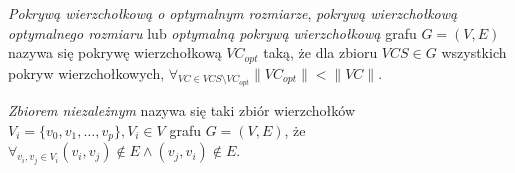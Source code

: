 \begin{definition}
  \emph{Pokrywą wierzchołkową o optymalnym rozmiarze}, \emph{pokrywą 
  wierzchołkową optymalnego rozmiaru} lub \emph{optymalną pokrywą wierzchołkową} 
  grafu $G=(V,E)$ nazywa się pokrywę wierzchołkową $VC_{opt}$ taką, że dla 
  zbioru $VCS \in G$ wszystkich pokryw wierzchołkowych,
  $\forall_{VC \in VCS \setminus VC_{opt}}{\|VC_{opt}\| < \|VC\|}$.
\end{definition}

\begin{definition}
  \emph{Zbiorem niezależnym} nazywa się taki zbiór wierzchołków\\
  $V_i=\{v_0, v_1, \ldots, v_p \}, V_i \in V$ grafu $G=(V,E)$, że
  $\forall_{v_i, v_j \in V_i}{(v_i, v_j) \notin E \land (v_j, v_i) \notin E}$.
\end{definition}

